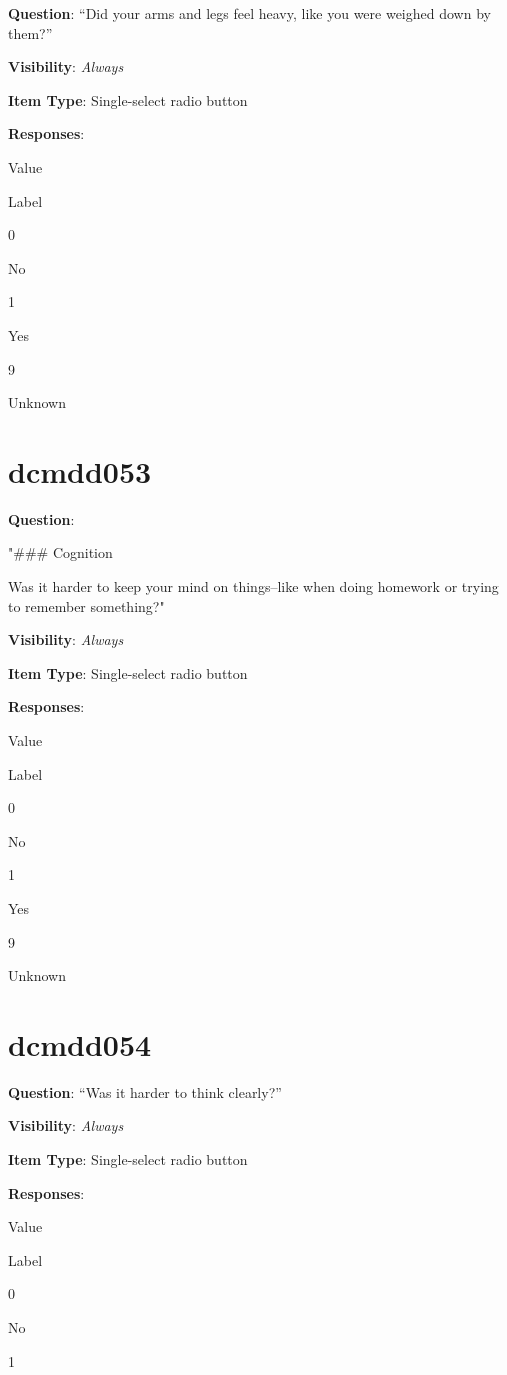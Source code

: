 \documentclass[
]{book}
\begin{document}
\textbf{Question}: ``Did your arms and legs feel heavy, like you were weighed down by them?''

\textbf{Visibility}: \emph{Always}

\textbf{Item Type}: Single-select radio button

\textbf{Responses}:

Value

Label

0

No

1

Yes

9

Unknown

\hypertarget{dcmdd053}{%
\section{dcmdd053}\label{dcmdd053}}

\textbf{Question}:

"\#\#\# Cognition

Was it harder to keep your mind on things--like when doing homework or trying to remember something?"

\textbf{Visibility}: \emph{Always}

\textbf{Item Type}: Single-select radio button

\textbf{Responses}:

Value

Label

0

No

1

Yes

9

Unknown

\hypertarget{dcmdd054}{%
\section{dcmdd054}\label{dcmdd054}}

\textbf{Question}: ``Was it harder to think clearly?''

\textbf{Visibility}: \emph{Always}

\textbf{Item Type}: Single-select radio button

\textbf{Responses}:

Value

Label

0

No

1
\end{document}
